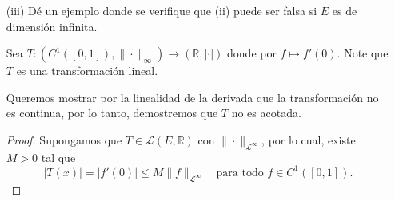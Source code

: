 \begin{enumerate}
\begin{proof}
    Como por hipótesis $E$ es un espacio vectorial de dimensión finita, tomemos la base de $E$ como $\mathcal{B}=\{v_1,v_2,\dots, v_n\}$, luego si $x\in E$ tenemos que $x=\displaystyle\sum_{i=1}^{n}x_iv_i$, entonces la transformación lineal T es de la forma,
      \begin{align*}
           Tx&=T\left( \displaystyle\sum_{i=1}^{n} x_i v_i\right) \\
           &=\displaystyle\sum_{i=1}^{n} x_i T(v_i),\\
           &\leq\displaystyle\sum_{i=1}^{n} x_i v_i \max_{\substack{1\leq i\leq n}} T(v_i),
        \end{align*} 
    así, tenemos que
    \begin{align*}
\|T\|_E 
&= \left\|\sum_{i=1}^{n} x_i T(v_i)\right\|_E\\
&\leq \sum_{i=1}^{n} \left\|x_i T(v_i)\right\|_E\\
    & =\sum_{i=1}^{n} |x_i| \cdot \|T(v_i)\|_E,
\end{align*}
 por el punto anterior, como $E$ es un espacio de dimensión finita existen constantes positivas $C_1$ y $C_2$, tal que $C_1\|x\|_E\leq\|x\|_1\leq C_2\|x\|_E$ y si tomamos a $M_1=\max_{\substack{1\leq i\leq n}} \|T(v_i)\|_E$, entonces,
 \begin{align*}
     \sum_{i=1}^{n} |x_i| \cdot \|T(v_i)\|_E\|x\|_1 &\leq\max_{\substack{1\leq i \leq n}} \|T(v_i)\|_E,\\
     &\leq M_1 C_2\|x\|_E\\
     &=M \|x\|_E,
 \end{align*}
 por lo cual, T es acotado y continuo.
    \end{proof}
    \item[(iii)] Dé un ejemplo donde se verifique que (ii) puede ser falsa si $E$ es de dimensión infinita.
\begin{sol}
    Sea $
T: (C^1([0,1]), \|\cdot\|_{\infty}) \longrightarrow (\mathbb{R}, |\cdot|)
$
donde por $f \mapsto f'(0)$. Note que $T$ es una transformación lineal.

Queremos mostrar por la linealidad de la derivada que la transformación no es continua,  por lo tanto, demostremos que $T$ no es acotada.
\begin{proof}

Supongamos que $T \in \mathcal{L}(E, \mathbb{R})$ con $\|\cdot\|_{\mathcal{L}^\infty}$, por lo cual,  existe $M > 0$ tal que 
$$
|T(x)| = |f'(0)| \leq M \|f\|_{\mathcal{L}^\infty }\quad \text{para todo } f \in C^1([0,1]).
$$


\end{proof}
\end{sol}
\end{enumerate}
